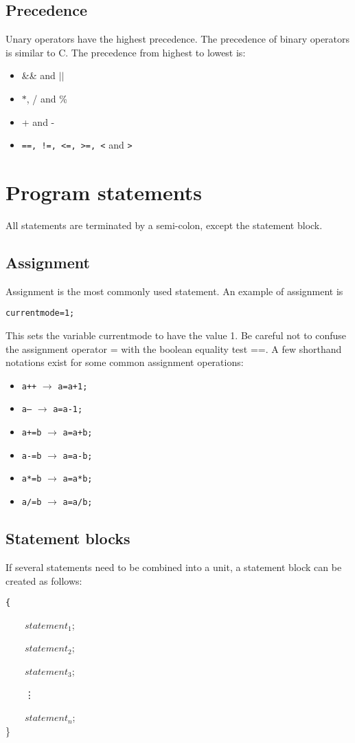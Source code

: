 \documentclass{article}
\def\pipe{$|$}
\begin{document}
\subsection{Precedence}
Unary operators have the highest precedence. 
The precedence of binary operators is similar to C.
The precedence from highest to lowest is:
\begin{itemize}
	\item \&\& and  \pipe\pipe
	\item $\ast$, / and \%
	\item + and -
	\item {\tt ==, !=, <=, >=, <}  and {\tt >}
\end{itemize}

\section{Program statements}
All statements are terminated by a semi-colon, except the
statement block.
\subsection{Assignment}
Assignment is the most commonly used statement.
An example of assignment is 
\begin{center}
	{\tt currentmode=1;}
\end{center}
This sets the variable currentmode to have the value 1. Be careful
not to confuse the assignment operator = with the boolean equality 
test ==.
A few shorthand notations exist for some common assignment operations:
\begin{itemize}
	\item {\tt a++} $\rightarrow$ {\tt a=a+1;}
	\item {\tt a--} $\rightarrow$ {\tt a=a-1;}
	\item {\tt a+=b} $\rightarrow$ {\tt a=a+b;}
	\item {\tt a-=b} $\rightarrow$ {\tt a=a-b;}
	\item {\tt a*=b} $\rightarrow$ {\tt a=a*b;}
	\item {\tt a/=b} $\rightarrow$ {\tt a=a/b;}
\end{itemize}
\subsection{Statement blocks}
If several statements need to be combined into a unit,
a statement block can be created as follows:
\begin{center}
	\parbox{5cm}{
	{\tt \{\\
		\strut\ \ \ \ $statement_1$;\\
		\strut\ \ \ \ $statement_2$;\\
		\strut\ \ \ \ $statement_3$;\\
		\strut\ \ \ \ \vdots\\
		\strut\ \ \ \ $statement_n$;\\
	\} }
	}
\end{center}
\end{document}
